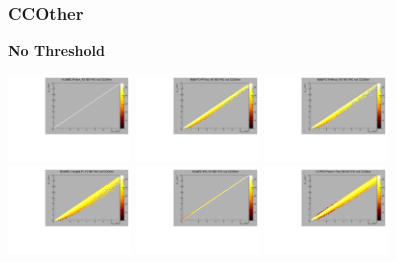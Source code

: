 \subsubsection{CCOther}

\textbf{No Threshold}

\begin{center}

  \includegraphics[width=0.245\textwidth]{plots/response_matrix/Proton_KE_FHC_CCOther_null.pdf}
  \includegraphics[width=0.245\textwidth]{plots/response_matrix/PiPlus_KE_FHC_CCOther_null.pdf}
  \includegraphics[width=0.245\textwidth]{plots/response_matrix/PiMinus_KE_FHC_CCOther_null.pdf}
  \includegraphics[width=0.245\textwidth]{plots/response_matrix/Charged_Pi_KE_FHC_CCOther_null.pdf}
  \includegraphics[width=0.245\textwidth]{plots/response_matrix/Pi0_KE_FHC_CCOther_null.pdf}
  \includegraphics[width=0.245\textwidth]{plots/response_matrix/Proton+Pion_KE_FHC_CCOther_null.pdf}

\end{center}
